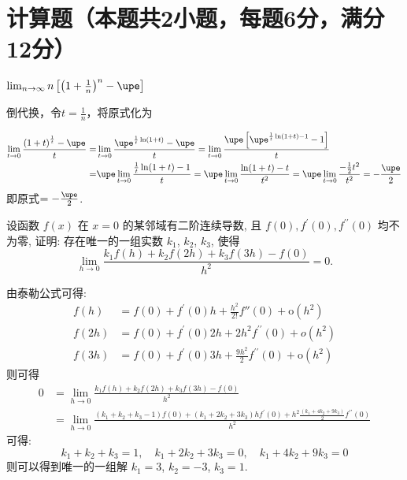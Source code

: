 \documentclass{USTBExam}
\begin{document}
\section{计算题（本题共2小题，每题6分，满分12分）}

\begin{problem}
  $\lim _{n \to \infty} n\left[\left(1+\frac{1}{n}\right)^{n}-\upe\right]$
\end{problem}

\begin{solution}
  倒代换，令$t=\frac{1}{n}$，将原式化为

  \begin{align*}
    \lim_{t \to 0} \frac{{{(1+t)}^{\frac{1}{t}}}- \upe }{t}
    = & \lim_{t \to 0} \frac{{{\upe}^{\frac{1}{t}\ln (1+t)}}- \upe }{t}
    =\lim_{t \to 0} \frac{ \upe \left[ {{\upe}^{\frac{1}{t}\ln (1+t)-1}}-1 \right]}{t} \\
    = & \upe \lim_{t \to 0} \frac{\frac{1}{t}\ln (1+t)-1}{t}
    = \upe \lim_{t \to 0} \frac{\ln (1+t)-t}{{{t}^{2}}}
    = \upe \lim_{t \to 0} \frac{-\frac{1}{2}t^2}{t^2}
    =-\frac{\upe}{2}
  \end{align*}
  即原式$=-\frac{\upe}{2}$.
\end{solution}

\begin{problem}
  设函数 $f(x)$ 在 $x=0$ 的某邻域有二阶连续导数, 且 $f(0), f^{\prime}(0), f^{\prime \prime}(0)$ 均不为零, 证明: 存在唯一的一组实数 $k_{1}$, $k_{2}$, $k_{3}$, 使得
  $$  \lim _{h \to 0} \frac{k_{1} f(h)+k_{2} f(2 h)+k_{3} f(3 h)-f(0)}{h^{2}}=0.  $$
\end{problem}

\begin{solution}
  由泰勒公式可得:
  \begin{align*}
    f(h)   & = f(0)+f^{\prime}(0) h+\frac{h^{2}}{2 !} f'' (0)+\mathrm{o}\left(h^{2}\right)                \\
    f(2 h) & = f(0)+f^{\prime}(0) 2 h+2 h^{2} f^{\prime \prime}(0)+o\left(h^{2}\right)                    \\
    f(3 h) & = f(0)+f^{\prime}(0) 3 h+\frac{9 h^{2}}{2} f^{\prime \prime}(0)+\mathrm{o}\left(h^{2}\right)
  \end{align*}
  则可得
  \begin{align*}
    0 & = \lim _{h \rightarrow 0} \frac{k_{1} f(h)+k_{2} f(2 h)+k_{3} f(3 h)-f(0)}{h^{2}}                                                                                                                       \\
      & =\lim _{h \rightarrow 0} \frac{\left(k_{1}+k_{2}+k_{3}-1\right) f(0)+\left(k_{1}+2 k_{2}+3 k_{3}\right) h f^{\prime}(0)+h^{2} \frac{\left(k_{1}+4 k_{2}+9 k_{3}\right)}{2} f^{\prime \prime}(0)}{h^{2}}
  \end{align*}
  可得:
  $$k_{1}+k_{2}+k_{3}=1, \quad k_{1}+2 k_{2}+3 k_{3}=0, \quad k_{1}+4 k_{2}+9 k_{3}=0$$
  则可以得到唯一的一组解 $k_{1}=3$, $k_{2}=-3$, $k_{3}=1$.
\end{solution}
\end{document}
